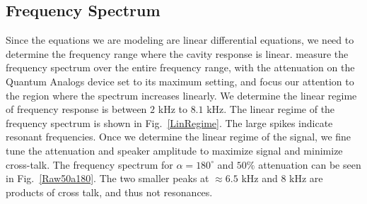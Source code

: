 \documentclass[12pt]{article}
\renewcommand{\deg}{^\circ} %
\newcommand{\figref}[1]{Fig.\ \ref{#1}}
\begin{document}
	\subsection{Frequency Spectrum}
	
	Since the equations we are modeling are linear differential equations, we need to determine the frequency range where the cavity response is linear. measure the frequency spectrum over the entire frequency range, with the attenuation on the Quantum Analogs device set to its maximum setting, and focus our attention to the region where the spectrum increases linearly. We determine the linear regime of frequency response is between $2$ kHz to $8.1$ kHz. The linear regime of the frequency spectrum is shown in \figref{LinRegime}. The large spikes indicate resonant frequencies. Once we determine the linear regime of the signal, we fine tune the attenuation and speaker amplitude to maximize signal and minimize cross-talk. The frequency spectrum for $\alpha = 180\deg$ and $50\%$ attenuation can be seen in \figref{Raw50a180}. The two smaller peaks at $\approx 6.5$ kHz and $8$ kHz are products of cross talk, and thus not resonances.
	
\end{document}
